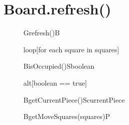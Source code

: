 \documentclass[8pt]{article}
\begin{document}
\section{Board.refresh()}
\begin{figure}[H]
	\centering
  	\begin{adjustbox}{width=\textwidth}
		\begin{sequencediagram}
			      
			\begin{call}{G}{refresh()}{B}{}	
				\begin{sdblock}{loop}{[for each square in squares]}
					\begin{call}{B}{isOccupied()}{S}{boolean}
					\end{call}
					\begin{sdblock}{alt}{[boolean == true]}
						\begin{call}{B}{getCurrentPiece()}{S}{currentPiece}
						\end{call}
						
				  		\begin{messcall}{B}{getMoveSquares(squares)}{P}
						\end{messcall}
				  		
				  		
				  	\end{sdblock}
	    
	    
				\end{sdblock}	
			\end{call}
		
		
		
		\end{sequencediagram}
	\end{adjustbox}
\end{figure}
\end{document}

